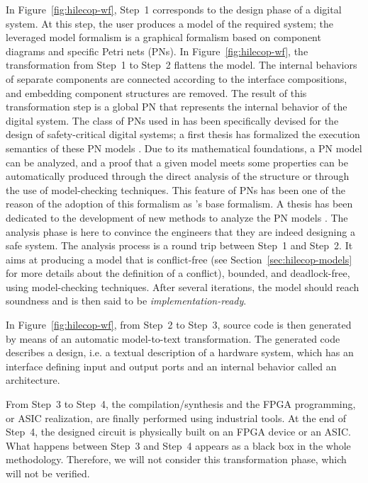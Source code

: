 In Figure~\ref{fig:hilecop-wf}, Step~1 corresponds to the design phase
of a digital system. At this step, the user produces a model of the
required system; the leveraged model formalism is a graphical
formalism based on component diagrams and specific Petri nets (PNs).
In Figure~\ref{fig:hilecop-wf}, the transformation from Step~1 to
Step~2 flattens the model. The internal behaviors of separate
components are connected according to the interface compositions, and
embedding component structures are removed. The result of this
transformation step is a global PN that represents the internal
behavior of the digital system.  The class of PNs used in \hilecop{}
has been specifically devised for the design of safety-critical
digital systems; a first thesis has formalized the execution semantics
of these PN models \cite{Leroux2014}. %
Due to its mathematical
foundations, a PN model can be analyzed, and a proof that a given
model meets some properties can be automatically produced through the
direct analysis of the structure or through the use of model-checking
techniques. This feature of PNs has been one of the reason of the
adoption of this formalism as \hilecop{}'s base formalism. A thesis
has been dedicated to the development of new methods to analyze the
\hilecop{} PN models \cite{Merzoug2018}. The analysis phase is here to
convince the engineers that they are indeed designing a safe
system. The analysis process is a round trip between Step~1 and
Step~2.  It aims at producing a model that is conflict-free (see
Section~\ref{sec:hilecop-models} for more details about the definition
of a conflict), bounded, and deadlock-free, using model-checking
techniques.  After several iterations, the model should reach
soundness and is then said to be \emph{implementation-ready}.

In Figure~\ref{fig:hilecop-wf}, from Step~2 to Step~3, \vhdl{} source
code is then generated by means of an automatic model-to-text
transformation. The generated code describes a \vhdl{} design, i.e. a
textual description of a hardware system, which has an interface
defining input and output ports and an internal behavior called an
architecture.

From Step~3 to Step~4, the \vhdl{} compilation/synthesis and the FPGA
programming, or ASIC realization, are finally performed using
industrial tools. At the end of Step~4, the designed circuit is
physically built on an FPGA device or an ASIC.  What happens between
Step~3 and Step~4 appears as a black box in the whole \hilecop{}
methodology. Therefore, we will not consider this transformation
phase, which will not be verified.

